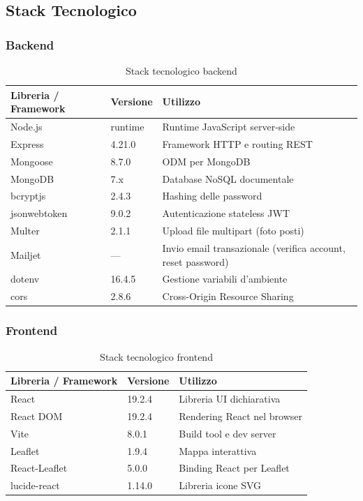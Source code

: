 \documentclass[a4paper,12pt]{article}
\begin{document}
\subsection{Stack Tecnologico}

\subsubsection*{Backend}

\begin{table}[h!]
\centering
\begin{tabular}{|l|l|l|}
\hline
\textbf{Libreria / Framework} & \textbf{Versione} & \textbf{Utilizzo} \\
\hline
Node.js      & runtime & Runtime JavaScript server-side \\
Express      & 4.21.0  & Framework HTTP e routing REST \\
Mongoose     & 8.7.0   & ODM per MongoDB \\
MongoDB      & 7.x     & Database NoSQL documentale \\
bcryptjs     & 2.4.3   & Hashing delle password \\
jsonwebtoken & 9.0.2   & Autenticazione stateless JWT \\
Multer       & 2.1.1   & Upload file multipart (foto posti) \\
Mailjet      & ---     & Invio email transazionale (verifica account, reset password) \\
dotenv       & 16.4.5  & Gestione variabili d'ambiente \\
cors         & 2.8.6   & Cross-Origin Resource Sharing \\
\hline
\end{tabular}
\caption{Stack tecnologico backend}
\end{table}

\subsubsection*{Frontend}

\begin{table}[h!]
\centering
\begin{tabular}{|l|l|l|}
\hline
\textbf{Libreria / Framework} & \textbf{Versione} & \textbf{Utilizzo} \\
\hline
React         & 19.2.4 & Libreria UI dichiarativa \\
React DOM     & 19.2.4 & Rendering React nel browser \\
Vite          & 8.0.1  & Build tool e dev server \\
Leaflet       & 1.9.4  & Mappa interattiva \\
React-Leaflet & 5.0.0  & Binding React per Leaflet \\
lucide-react  & 1.14.0 & Libreria icone SVG \\
\hline
\end{tabular}
\caption{Stack tecnologico frontend}
\end{table}
\end{document}
